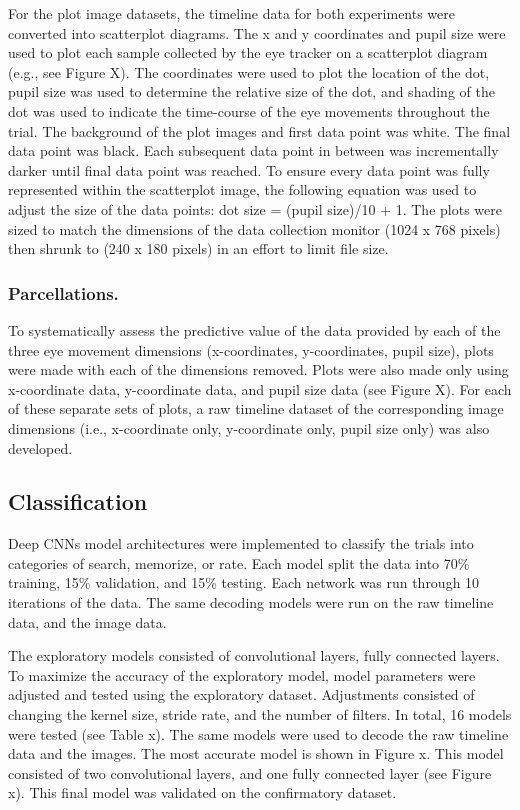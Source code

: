 \documentclass[
  english,
  man]{apa6}
\begin{document}
For the plot image datasets, the timeline data for both experiments were converted into scatterplot diagrams. The x and y coordinates and pupil size were used to plot each sample collected by the eye tracker on a scatterplot diagram (e.g., see Figure X). The coordinates were used to plot the location of the dot, pupil size was used to determine the relative size of the dot, and shading of the dot was used to indicate the time-course of the eye movements throughout the trial. The background of the plot images and first data point was white. The final data point was black. Each subsequent data point in between was incrementally darker until final data point was reached. To ensure every data point was fully represented within the scatterplot image, the following equation was used to adjust the size of the data points: dot size = (pupil size)/10 + 1. The plots were sized to match the dimensions of the data collection monitor (1024 x 768 pixels) then shrunk to (240 x 180 pixels) in an effort to limit file size.

\subsubsection{Parcellations.}

To systematically assess the predictive value of the data provided by each of the three eye movement dimensions (x-coordinates, y-coordinates, pupil size), plots were made with each of the dimensions removed. Plots were also made only using x-coordinate data, y-coordinate data, and pupil size data (see Figure X). For each of these separate sets of plots, a raw timeline dataset of the corresponding image dimensions (i.e., x-coordinate only, y-coordinate only, pupil size only) was also developed.

\subsection{Classification}

Deep CNNs model architectures were implemented to classify the trials into categories of search, memorize, or rate. Each model split the data into 70\% training, 15\% validation, and 15\% testing. Each network was run through 10 iterations of the data. The same decoding models were run on the raw timeline data, and the image data.

The exploratory models consisted of \emph{} convolutional layers, \emph{} fully connected layers. To maximize the accuracy of the exploratory model, model parameters were adjusted and tested using the exploratory dataset. Adjustments consisted of changing the kernel size, stride rate, and the number of filters. In total, 16 models were tested (see Table x). The same models were used to decode the raw timeline data and the images. The most accurate model is shown in Figure x. This model consisted of two convolutional layers, and one fully connected layer (see Figure x). This final model was validated on the confirmatory dataset.
\end{document}
